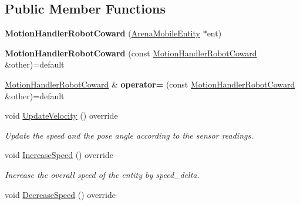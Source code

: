 \subsection*{Public Member Functions}
\begin{DoxyCompactItemize}
\item 
{\bfseries Motion\+Handler\+Robot\+Coward} (\hyperlink{class_arena_mobile_entity}{Arena\+Mobile\+Entity} $\ast$ent)\hypertarget{class_motion_handler_robot_coward_a51242788c5a3ca3dc46530a14ab8e301}{}\label{class_motion_handler_robot_coward_a51242788c5a3ca3dc46530a14ab8e301}

\item 
{\bfseries Motion\+Handler\+Robot\+Coward} (const \hyperlink{class_motion_handler_robot_coward}{Motion\+Handler\+Robot\+Coward} \&other)=default\hypertarget{class_motion_handler_robot_coward_ae650416cd316871701127a288eed709a}{}\label{class_motion_handler_robot_coward_ae650416cd316871701127a288eed709a}

\item 
\hyperlink{class_motion_handler_robot_coward}{Motion\+Handler\+Robot\+Coward} \& {\bfseries operator=} (const \hyperlink{class_motion_handler_robot_coward}{Motion\+Handler\+Robot\+Coward} \&other)=default\hypertarget{class_motion_handler_robot_coward_a3bcc3dd802154daf29fa2740bd6c31ae}{}\label{class_motion_handler_robot_coward_a3bcc3dd802154daf29fa2740bd6c31ae}

\item 
void \hyperlink{class_motion_handler_robot_coward_a5f4f03d6128a7d19b2c36af433a17cfd}{Update\+Velocity} () override\hypertarget{class_motion_handler_robot_coward_a5f4f03d6128a7d19b2c36af433a17cfd}{}\label{class_motion_handler_robot_coward_a5f4f03d6128a7d19b2c36af433a17cfd}

\begin{DoxyCompactList}\small\item\em Update the speed and the pose angle according to the sensor readings. \end{DoxyCompactList}\item 
void \hyperlink{class_motion_handler_robot_coward_a22416ce3267987817dc3aba02bfb5d7b}{Increase\+Speed} () override\hypertarget{class_motion_handler_robot_coward_a22416ce3267987817dc3aba02bfb5d7b}{}\label{class_motion_handler_robot_coward_a22416ce3267987817dc3aba02bfb5d7b}

\begin{DoxyCompactList}\small\item\em Increase the overall speed of the entity by speed\+\_\+delta. \end{DoxyCompactList}\item 
void \hyperlink{class_motion_handler_robot_coward_ad8280dc0f2bcdaf93b68ae87447cdef4}{Decrease\+Speed} () override\hypertarget{class_motion_handler_robot_coward_ad8280dc0f2bcdaf93b68ae87447cdef4}{}\label{class_motion_handler_robot_coward_ad8280dc0f2bcdaf93b68ae87447cdef4}


\end{DoxyCompactItemize}
